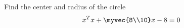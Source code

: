 \begin{flushleft}
Find the center and radius of the circle
\begin{align}
x^Tx + \myvec{8\\10}x - 8 = 0
\end{align}
\end{flushleft}
